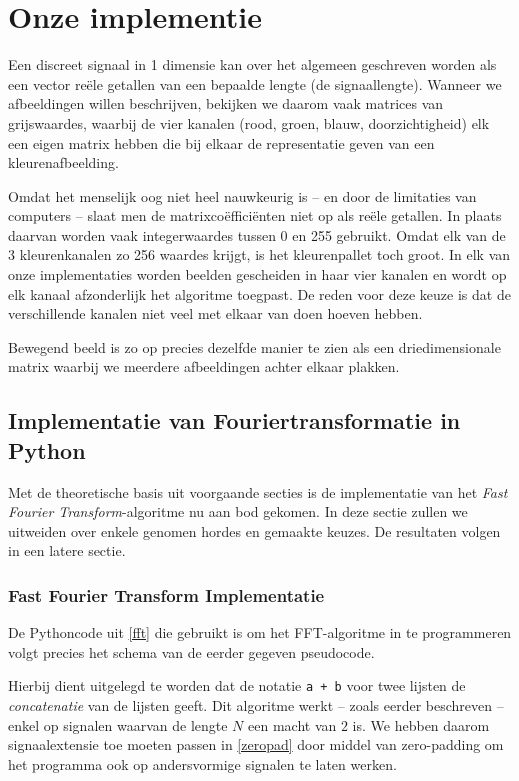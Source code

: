\chapter{Onze implementie}
\label{implementatieH}
Een discreet signaal in 1 dimensie kan over het algemeen geschreven worden als een vector re\"ele getallen van een bepaalde lengte (de signaallengte). Wanneer we afbeeldingen willen beschrijven, bekijken we daarom vaak matrices van grijswaardes, waarbij de vier kanalen (rood, groen, blauw, doorzichtigheid) elk een eigen matrix hebben die bij elkaar de representatie geven van een kleurenafbeelding.

Omdat het menselijk oog niet heel nauwkeurig is -- en door de limitaties van computers -- slaat men de matrixco\"effici\"enten niet op als re\"ele getallen. In plaats daarvan worden vaak integerwaardes tussen 0 en 255 gebruikt. Omdat elk van de 3 kleurenkanalen zo 256 waardes krijgt, is het kleurenpallet toch groot. In elk van onze implementaties worden beelden gescheiden in haar vier kanalen en wordt op elk kanaal afzonderlijk het algoritme toegpast. De reden voor deze keuze is dat de verschillende kanalen niet veel met elkaar van doen hoeven hebben.

Bewegend beeld is zo op precies dezelfde manier te zien als een driedimensionale matrix waarbij we meerdere afbeeldingen achter elkaar plakken.

\section{Implementatie van Fouriertransformatie in Python}
Met de theoretische basis uit voorgaande secties is de implementatie van het 
\emph{Fast Fourier Transform}-algoritme nu aan bod gekomen. 
In deze sectie zullen we uitweiden over enkele genomen hordes en gemaakte keuzes. De resultaten volgen
in een latere sectie.

\subsection{Fast Fourier Transform Implementatie}
De Pythoncode uit \autoref{fft} die gebruikt is om het FFT-algoritme in te programmeren volgt precies het schema van de eerder gegeven pseudocode.

Hierbij dient uitgelegd te worden dat de notatie \texttt{a + b} voor twee lijsten de \emph{concatenatie} van de lijsten geeft.
Dit algoritme werkt -- zoals eerder beschreven -- enkel op signalen waarvan de lengte
$N$ een macht van $2$ is. We hebben daarom signaalextensie toe moeten passen in \autoref{zeropad} door middel van zero-padding
om het programma ook op andersvormige signalen te laten werken.

